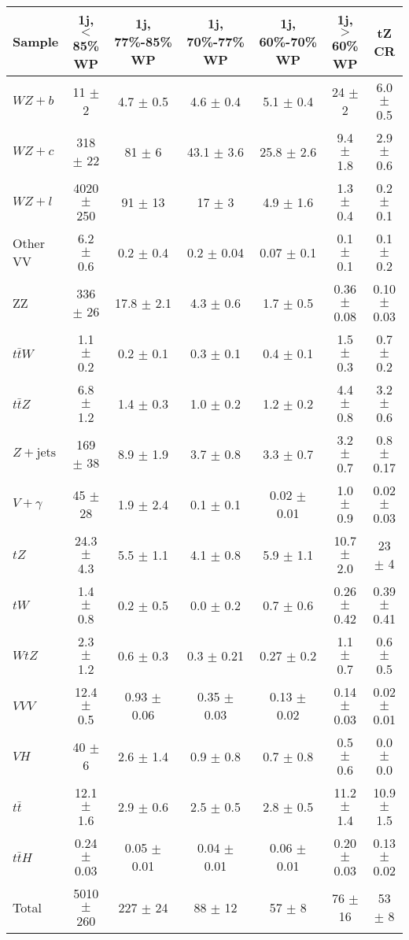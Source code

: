 \begin{tabular}{|l|c|c|c|c|c|c|}
\hline 
Sample & {1j, $<$85\% WP} & {1j, 77\%-85\% WP} & {1j, 70\%-77\% WP} & {1j, 60\%-70\% WP} & {1j, $>$60\% WP} & {tZ CR}\\
\hline 
  $WZ + b$   & 11 $\pm$ 2 & 4.7 $\pm$ 0.5 & 4.6 $\pm$ 0.4 & 5.1 $\pm$ 0.4 & 24 $\pm$ 2 & 6.0 $\pm$ 0.5 \\ 
  $WZ + c$   & 318 $\pm$ 22 & 81 $\pm$ 6 & 43.1 $\pm$ 3.6 & 25.8 $\pm$ 2.6 & 9.4 $\pm$ 1.8 & 2.9 $\pm$ 0.6 \\ 
  $WZ + l$   & 4020 $\pm$ 250 & 91 $\pm$ 13 & 17 $\pm$ 3 & 4.9 $\pm$ 1.6 & 1.3 $\pm$ 0.4 & 0.2 $\pm$ 0.1 \\ 
  Other VV   & 6.2 $\pm$ 0.6 & 0.2 $\pm$ 0.4 & 0.2 $\pm$ 0.04 & 0.07 $\pm$ 0.1 & 0.1 $\pm$ 0.1 & 0.1 $\pm$ 0.2 \\ 
  ZZ   & 336 $\pm$ 26 & 17.8 $\pm$ 2.1 & 4.3 $\pm$ 0.6 & 1.7 $\pm$ 0.5 & 0.36 $\pm$ 0.08 & 0.10 $\pm$ 0.03 \\ 
  $t\bar{t}W$   & 1.1 $\pm$ 0.2 & 0.2 $\pm$ 0.1 & 0.3 $\pm$ 0.1 & 0.4 $\pm$ 0.1 & 1.5 $\pm$ 0.3 & 0.7 $\pm$ 0.2 \\ 
  $t\bar{t}Z$   & 6.8 $\pm$ 1.2 & 1.4 $\pm$ 0.3 & 1.0 $\pm$ 0.2 & 1.2 $\pm$ 0.2 & 4.4 $\pm$ 0.8 & 3.2 $\pm$ 0.6 \\ 
  $Z+\text{jets}$   & 169 $\pm$ 38 & 8.9 $\pm$ 1.9 & 3.7 $\pm$ 0.8 & 3.3 $\pm$ 0.7 & 3.2 $\pm$ 0.7 & 0.8 $\pm$ 0.17 \\ 
  $V+\gamma$   & 45 $\pm$ 28 & 1.9 $\pm$ 2.4 & 0.1 $\pm$ 0.1 & 0.02 $\pm$ 0.01 & 1.0 $\pm$ 0.9 & 0.02 $\pm$ 0.03 \\ 
  $tZ$   & 24.3 $\pm$ 4.3 & 5.5 $\pm$ 1.1 & 4.1 $\pm$ 0.8 & 5.9 $\pm$ 1.1 & 10.7 $\pm$ 2.0 & 23 $\pm$ 4 \\ 
  $tW$   & 1.4 $\pm$ 0.8 & 0.2 $\pm$ 0.5 & 0.0 $\pm$ 0.2 & 0.7 $\pm$ 0.6 & 0.26 $\pm$ 0.42 & 0.39 $\pm$ 0.41 \\ 
  $WtZ$   & 2.3 $\pm$ 1.2 & 0.6 $\pm$ 0.3 & 0.3 $\pm$ 0.21 & 0.27 $\pm$ 0.2 & 1.1 $\pm$ 0.7 & 0.6 $\pm$ 0.5 \\ 
  $VVV$   & 12.4 $\pm$ 0.5 & 0.93 $\pm$ 0.06 & 0.35 $\pm$ 0.03 & 0.13 $\pm$ 0.02 & 0.14 $\pm$ 0.03 & 0.02 $\pm$ 0.01 \\ 
  $VH$   & 40 $\pm$ 6 & 2.6 $\pm$ 1.4 & 0.9 $\pm$ 0.8 & 0.7 $\pm$ 0.8 & 0.5 $\pm$ 0.6 & 0.0 $\pm$ 0.0 \\ 
  $t\bar{t}$   & 12.1 $\pm$ 1.6 & 2.9 $\pm$ 0.6 & 2.5 $\pm$ 0.5 & 2.8 $\pm$ 0.5 & 11.2 $\pm$ 1.4 & 10.9 $\pm$ 1.5 \\ 
  $t\bar{t}H$   & 0.24 $\pm$ 0.03 & 0.05 $\pm$ 0.01 & 0.04 $\pm$ 0.01 & 0.06 $\pm$ 0.01 & 0.20 $\pm$ 0.03 & 0.13 $\pm$ 0.02 \\ 
\hline 
  Total  & 5010 $\pm$ 260 & 227 $\pm$ 24 & 88 $\pm$ 12 & 57 $\pm$ 8 & 76 $\pm$ 16 & 53 $\pm$ 8 \\ 
\hline 
\end{tabular} 


